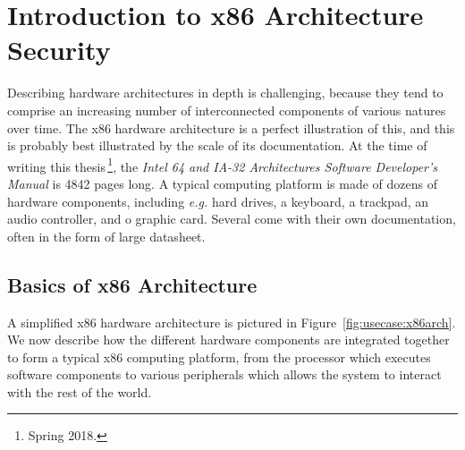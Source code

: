 \section{Introduction to x86 Architecture Security}
\label{sec:usecase:architecture}

Describing hardware architectures in depth is challenging, because they tend to
comprise an increasing number of interconnected components of various natures
over time.
%
The x86 hardware architecture is a perfect illustration of this, and this is
probably best illustrated by the scale of its documentation.
%
At the time of writing this thesis\,\footnote{Spring 2018.}, the \emph{Intel 64
  and IA-32 Architectures Software Developer’s Manual} is 4842 pages long.
%
A typical computing platform is made of dozens of hardware components, including
\emph{e.g.} hard drives, a keyboard, a trackpad, an audio controller, and o
graphic card.
%
Several come with their own documentation, often in the form of large datasheet.

\subsection{Basics of x86 Architecture}

A simplified x86 hardware architecture is pictured in
Figure~\ref{fig:usecase:x86arch}.
%
We now describe how the different hardware components are integrated together to
form a typical x86 computing platform, from the processor which executes
software components to various peripherals which allows the system to interact
with the rest of the world.

